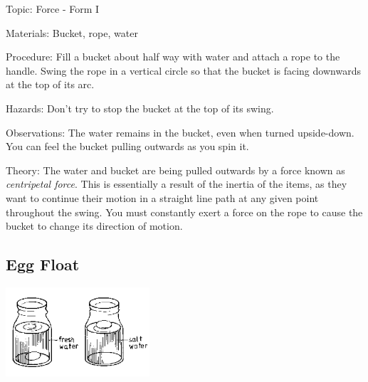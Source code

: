 \begin{multicols}{2}
\begin{description*}
\item[Topic:]{Force - Form I}
\item[Materials:]{Bucket, rope, water}
\item[Procedure:]{Fill a bucket about half way with water and attach a rope to the handle. Swing the rope in a vertical circle so that the bucket is facing downwards at the top of its arc.}
\item[Hazards:]{Don't try to stop the bucket at the top of its swing.}
\item[Observations:]{The water remains in the bucket, even when turned upside-down. You can feel the bucket pulling outwards as you spin it.}
\item[Theory:]{The water and bucket are being pulled outwards by a force known as \emph{centripetal force}. This is essentially a result of the inertia of the items, as they want to continue their motion in a straight line path at any given point throughout the swing. You must constantly exert a force on the rope to cause the bucket to change its direction of motion.}
\end{description*}

\subsection{Egg Float}

\begin{center}
\includegraphics[width=0.4\textwidth]{./img/source/egg-float.png}
\end{center}


\end{multicols}
